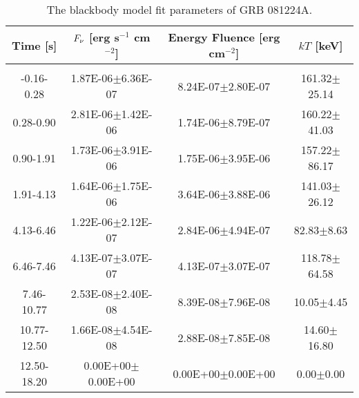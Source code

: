 \begin{table}[h]
\centering
\scriptsize
\label{tab:}
\begin{tabular}{c| c c c}
Time [s] & $F_{\nu}$ [erg s$^{-1}$ cm$^{-2}$] & Energy Fluence [erg cm$^{-2}$] & $kT$ [keV] \\
\hline \hline\\ 

-0.16-0.28 & 1.87E-06$\pm$6.36E-07 & 8.24E-07$\pm$2.80E-07 & 161.32$\pm$25.14 \\ 

0.28-0.90 & 2.81E-06$\pm$1.42E-06 & 1.74E-06$\pm$8.79E-07 & 160.22$\pm$41.03 \\ 

0.90-1.91 & 1.73E-06$\pm$3.91E-06 & 1.75E-06$\pm$3.95E-06 & 157.22$\pm$86.17 \\ 

1.91-4.13 & 1.64E-06$\pm$1.75E-06 & 3.64E-06$\pm$3.88E-06 & 141.03$\pm$26.12 \\ 

4.13-6.46 & 1.22E-06$\pm$2.12E-07 & 2.84E-06$\pm$4.94E-07 & 82.83$\pm$8.63 \\ 

6.46-7.46 & 4.13E-07$\pm$3.07E-07 & 4.13E-07$\pm$3.07E-07 & 118.78$\pm$64.58 \\ 

7.46-10.77 & 2.53E-08$\pm$2.40E-08 & 8.39E-08$\pm$7.96E-08 & 10.05$\pm$4.45 \\ 

10.77-12.50 & 1.66E-08$\pm$4.54E-08 & 2.88E-08$\pm$7.85E-08 & 14.60$\pm$16.80 \\ 

12.50-18.20 & 0.00E+00$\pm$0.00E+00 & 0.00E+00$\pm$0.00E+00 & 0.00$\pm$0.00 \\ 

\end{tabular}
\caption{The blackbody model fit parameters of GRB 081224A.}
\end{table}

